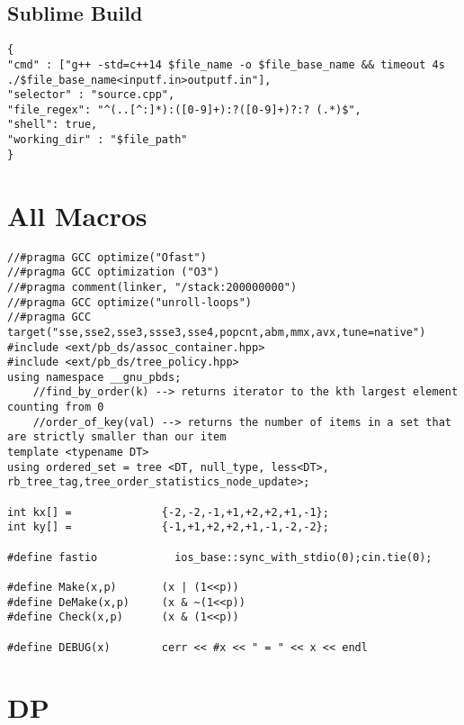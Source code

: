 \documentclass[10pt,a4paper,onesided]{article}
\begin{document}
\begin{multicols*}{3}
\tableofcontents
\newpage
{}
\subsection*{Sublime Build}
    \begin{lstlisting}
{
"cmd" : ["g++ -std=c++14 $file_name -o $file_base_name && timeout 4s ./$file_base_name<inputf.in>outputf.in"], 
"selector" : "source.cpp",
"file_regex": "^(..[^:]*):([0-9]+):?([0-9]+)?:? (.*)$",
"shell": true,
"working_dir" : "$file_path"
}
    \end{lstlisting}
\section{All Macros}
\begin{lstlisting}
//#pragma GCC optimize("Ofast")
//#pragma GCC optimization ("O3")
//#pragma comment(linker, "/stack:200000000")
//#pragma GCC optimize("unroll-loops")
//#pragma GCC target("sse,sse2,sse3,ssse3,sse4,popcnt,abm,mmx,avx,tune=native")
#include <ext/pb_ds/assoc_container.hpp>
#include <ext/pb_ds/tree_policy.hpp>
using namespace __gnu_pbds;
    //find_by_order(k) --> returns iterator to the kth largest element counting from 0
    //order_of_key(val) --> returns the number of items in a set that are strictly smaller than our item
template <typename DT> 
using ordered_set = tree <DT, null_type, less<DT>, rb_tree_tag,tree_order_statistics_node_update>;

int kx[] =              {-2,-2,-1,+1,+2,+2,+1,-1};
int ky[] =              {-1,+1,+2,+2,+1,-1,-2,-2};

#define fastio            ios_base::sync_with_stdio(0);cin.tie(0);

#define Make(x,p)       (x | (1<<p))
#define DeMake(x,p)     (x & ~(1<<p))
#define Check(x,p)      (x & (1<<p))

#define DEBUG(x)        cerr << #x << " = " << x << endl

\end{lstlisting}
\section{DP}

\end{multicols*}
\end{document}
